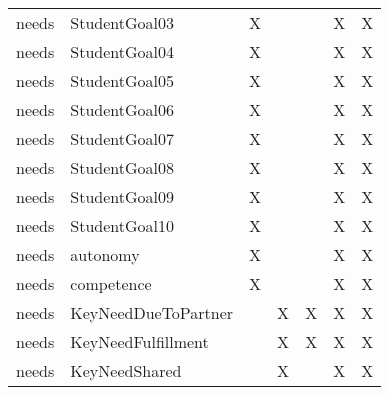 \documentclass[
]{article}
\begin{document}
\begin{table}
\begin{tabular}[t]{llccccc}
needs & StudentGoal03 & X &  &  & X & X\\
needs & StudentGoal04 & X &  &  & X & X\\
needs & StudentGoal05 & X &  &  & X & X\\
\addlinespace
needs & StudentGoal06 & X &  &  & X & X\\
needs & StudentGoal07 & X &  &  & X & X\\
needs & StudentGoal08 & X &  &  & X & X\\
needs & StudentGoal09 & X &  &  & X & X\\
needs & StudentGoal10 & X &  &  & X & X\\
\addlinespace
needs & autonomy & X &  &  & X & X\\
needs & competence & X &  &  & X & X\\
needs & KeyNeedDueToPartner &  & X & X & X & X\\
needs & KeyNeedFulfillment &  & X & X & X & X\\
needs & KeyNeedShared &  & X &  & X & X\\
\bottomrule
\end{tabular}
\end{table}
\end{document}
